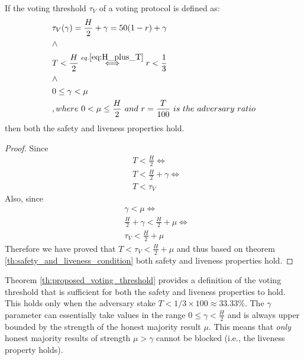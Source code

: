 \begin{theorem}\label{th:proposed_voting_threshold}
	If the voting threshold $\tau_V$ of a voting protocol is defined as:
	\begin{align*}
		&\tau_V(\gamma) = \frac{H}{2} + \gamma = 50(1 - r) + \gamma\\
		&\land\\
		&T < \frac{H}{2} \overset{eq. \ref{eq:H_plus_T}}{\iff} r < \frac{1}{3}\\
		&\land\\
		&0 \leq \gamma < \mu\\
		&,where\ 0 < \mu \leq \frac{H}{2}\ and\ r = \frac{T}{100}\ is\ the\ 
		adversary\ ratio
	\end{align*}
	then both the safety and liveness properties hold.
	\begin{proof}
		Since 
		\begin{align*}
			&T < \frac{H}{2} \iff\\
			&T < \frac{H}{2} + \gamma \iff\\
			&T < \tau_V
		\end{align*}
		Also, since
		\begin{align*}
			&\gamma < \mu \iff\\
			&\frac{H}{2} + \gamma < \frac{H}{2} + \mu \iff\\
			&\tau_V < \frac{H}{2} + \mu
		\end{align*}
		Therefore we have proved that $T < \tau_V < \frac{H}{2} + \mu$ and thus 
		based on theorem \ref{th:safety_and_liveness_condition} both safety and 
		liveness properties hold.
	\end{proof}
\end{theorem}

Theorem \ref{th:proposed_voting_threshold} provides a definition of the voting 
threshold that is sufficient for both the safety and liveness properties to 
hold. This holds only when the adversary stake $T < 1/3 \times 100 \approx 
33.33\%$. The $\gamma$ parameter can essentially take values in the range $0 
\leq \gamma < \frac{H}{2}$ and is always upper bounded by the strength of the 
honest majority result $\mu$. This means that \emph{only} honest majority 
results of strength $\mu > \gamma$ cannot be blocked (i.e., the liveness 
property holds).

